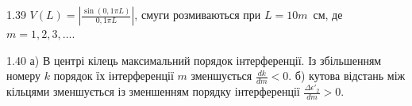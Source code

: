\begin{Solution}{1.{39}}
	$V(L) = \left| \frac{\sin(0,1\pi L)}{0,1\pi L}\right|$, смуги розмиваються при $L = 10m$~см, де $m = 1, 2, 3, \ldots$.
\end{Solution}
\begin{Solution}{1.{40}}
	а) В центрі кілець максимальний порядок інтерференції. Із збільшенням номеру
	$k$ порядок їх інтерференції $ m $ зменшується $\frac{dk}{dm} < 0$. б) кутова відстань між кільцями зменшується із зменшенням порядку інтерференції  $\frac{\Delta \epsilon'_2}{dm} > 0 $.
\end{Solution}
